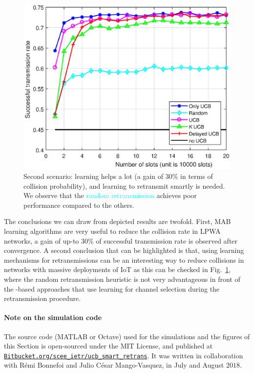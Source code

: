 \begin{figure}[h!]  %
	\centering
	\includegraphics[width=0.75\linewidth]{ResultsUCB2.eps}
	\caption[First comparison between the exposed heuristics for the retransmission: Only \UCB, Random, \UCB, $K$ \UCB, and Delayed \UCB]{
		Second scenario: learning helps a lot (a gain of $30\%$ in terms of collision probability), and learning to retransmit smartly is needed.
		We observe that the \textcolor{cyan}{random retransmission} achieves poor performance compared to the others.
	}
	\label{fig:43:mainExperiment2}
\end{figure}

The conclusions we can draw from depicted results are twofold.
First, MAB learning algorithms are very useful to reduce the collision rate in LPWA networks, a gain of up-to $30\%$ of successful transmission rate is observed after convergence.
A second conclusion that can be highlighted is that, using learning mechanisms for retransmissions can be an interesting way to reduce collisions in networks with massive deployments of IoT as this can be checked in Fig.~\ref{fig:43:mainExperiment2}, where the random retransmission heuristic is not very advantageous in front of the  \UCB-based approaches that use learning for channel selection during the retransmission procedure.


\paragraph{Note on the simulation code}
%
The source code (MATLAB or Octave) used for the simulations and the figures of this Section is open-sourced under the MIT License, and published at \href{https://Bitbucket.org/scee_ietr/ucb_smart_retrans}{\texttt{Bitbucket.org/scee\_ietr/ucb\_smart\_retrans}}.
It was written in collaboration with Rémi Bonnefoi and Julio César Mango-Vasquez, in July and August $2018$.
